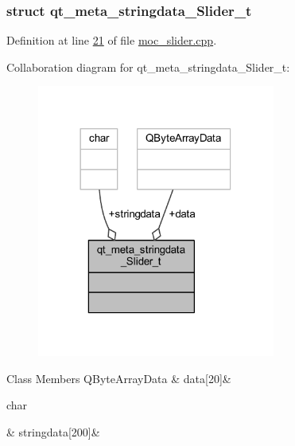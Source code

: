 \subsubsection{struct qt\+\_\+meta\+\_\+stringdata\+\_\+\+Slider\+\_\+t}


Definition at line \hyperlink{a00070_source_l00021}{21} of file \hyperlink{a00070_source}{moc\+\_\+slider.\+cpp}.



Collaboration diagram for qt\+\_\+meta\+\_\+stringdata\+\_\+\+Slider\+\_\+t\+:
\nopagebreak
\begin{figure}[H]
\begin{center}
\leavevmode
\includegraphics[width=222pt]{d3/db8/a00316}
\end{center}
\end{figure}
\begin{DoxyFields}{Class Members}
\hypertarget{a00070_a28e23ecab9373bb818a81f9a092a52de}{Q\+Byte\+Array\+Data}\label{a00070_a28e23ecab9373bb818a81f9a092a52de}
&
data\mbox{[}20\mbox{]}&
\\
\hline

\hypertarget{a00070_aa9f32a65077d2d4f1c99ac3536a308da}{char}\label{a00070_aa9f32a65077d2d4f1c99ac3536a308da}
&
stringdata\mbox{[}200\mbox{]}&
\\
\hline

\end{DoxyFields}


